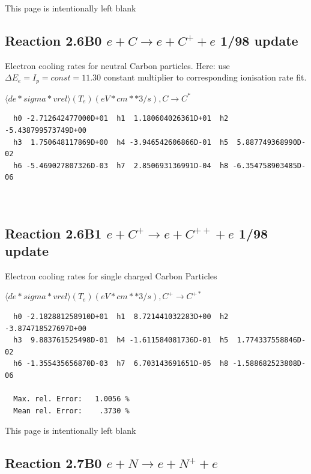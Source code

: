 \documentclass[12pt,dvipdfmx]{article}
\begin{document}
\newpage
This page is intentionally left blank
\newpage

\subsection{
Reaction 2.6B0 $e + C \rightarrow e + C^+ + e  $ 1/98 update
}

 Electron cooling rates for neutral
 Carbon particles. Here: use $\Delta E_e = I_p = const = 11.30$
 constant multiplier to corresponding ionisation rate fit.

$  \langle de*sigma*vrel \rangle(T_e)  (eV*cm**3/s), C   \rightarrow C^* $


\begin{small}\begin{verbatim}
  h0 -2.712642477000D+01  h1  1.180604026361D+01  h2 -5.438799573749D+00
  h3  1.750648117869D+00  h4 -3.946542606866D-01  h5  5.887749368990D-02
  h6 -5.469027807326D-03  h7  2.850693136991D-04  h8 -6.354758903485D-06



\end{verbatim}\end{small}

\subsection{
Reaction 2.6B1 $e + C^+ \rightarrow e + C^{++} + e  $ 1/98 update
}

 Electron cooling rates for single
 charged Carbon Particles

 $ \langle de*sigma*vrel \rangle(T_e)  (eV*cm**3/s), C^+ \rightarrow C^{+*} $


\begin{small}\begin{verbatim}
  h0 -2.182881258910D+01  h1  8.721441032283D+00  h2 -3.874718527697D+00
  h3  9.883761525498D-01  h4 -1.611584081736D-01  h5  1.774337558846D-02
  h6 -1.355435656870D-03  h7  6.703143691651D-05  h8 -1.588682523808D-06

  Max. rel. Error:   1.0056 %
  Mean rel. Error:    .3730 %

\end{verbatim}\end{small}

\newpage
This page is intentionally left blank
\newpage

\subsection{
Reaction 2.7B0 $e + N \rightarrow e + N^{+} + e  $
}
\end{document}
